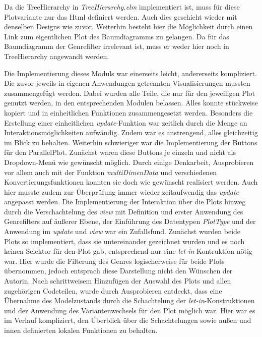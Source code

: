 \documentclass[usegeometry=true]{scrartcl}
\begin{document}
Da die TreeHierarchy in \textit{TreeHierarchy.elm} implementiert ist, muss für diese Plotvariante nur das Html definiert werden.
Auch dies geschieht wieder mit denselben Designs wie zuvor. 
Weiterhin besteht hier die Möglichkeit durch einen Link zum eigentlichen Plot des Baumdiagramms zu gelangen.
Da für das Baumdiagramm der Genrefilter irrelevant ist, muss er weder hier noch in TreeHierarchy angewandt werden. 


Die Implementierung dieses Moduls war einerseits leicht, andererseits kompliziert. 
Die zuvor jeweils in eigenen Anwendungen getrennten Visualisierungen mussten zusammengefügt werden.
Dabei wurden alle Teile, die nur für den jeweiligen Plot genutzt werden, in den entsprechenden Modulen belassen. 
Alles konnte stückweise kopiert und in einheitlichen Funktionen zusammengesetzt werden. 
Besonders die Erstellung einer einheitlichen \textit{update}-Funktion war zeitlich durch die Menge an Interaktionsmöglichkeiten aufwändig.
Zudem war es anstrengend, alles gleichzeitig im Blick zu behalten.
Weiterhin schwieriger war die Implementierung der Buttons für den ParallelPlot. 
Zunächst waren diese Buttons je einzeln und nicht als Dropdown-Menü wie gewünscht möglich. 
Durch einige Denkarbeit, Ausprobieren vor allem auch mit der Funktion \textit{multiDimenData} und verschiedenen Konvertierungsfunktionen konnten sie doch wie gewünscht realisiert werden.
Auch hier musste zudem zur Überprüfung immer wieder zeitaufwendig das \textit{update} angepasst werden.
Die Implementierung der Interaktion über die Plots hinweg durch die Verschachtelung des \textit{view} mit Definition und erster Anwendung des Genrefilters auf äußerer Ebene, der Einführung des Datentypen \textit{PlotType} und der Anwendung im \textit{update} und \textit{view} war ein Zufallsfund.
Zunächst wurden beide Plots so implementiert, dass sie untereinander gezeichnet wurden und es noch keinen Selektor für den Plot gab, entsprechend nur eine \textit{let-in}-Kontruktion nötig war.
Hier wurde die Filterung des Genres logischerweise für beide Plots übernommen, jedoch entsprach diese Darstellung nicht den Wünschen der Autorin. 
Nach schrittweisem Hinzufügen der Auswahl des Plots und allen zugehörigen Codeteilen, wurde durch Ausprobieren entdeckt, dass eine Übernahme des Modelzustands durch die Schachtelung der \textit{let-in}-Konstruktionen und der Anwendung des Variantenwechsels für den Plot möglich war. 
Hier war es im Verlauf kompliziert, den Überblick über die Schachtelungen sowie außen und innen definierten lokalen Funktionen zu behalten.
\end{document}
